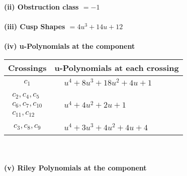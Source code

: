 \documentclass[1p]{elsarticle_modified}
\theoremstyle{definition}
\begin{document}
\flushleft \textbf{(ii) Obstruction class $= -1$}\\~\\
\flushleft \textbf{(iii) Cusp Shapes $= 4 u^3+14 u+12$}\\~\\
\newpage\renewcommand{\arraystretch}{1}
\flushleft \textbf{(iv) u-Polynomials at the component}\newline \\
\begin{tabular}{m{50pt}|m{274pt}}
Crossings & \hspace{64pt}u-Polynomials at each crossing \\
\hline $$\begin{aligned}c_{1}\end{aligned}$$&$\begin{aligned}
&u^4+8 u^3+18 u^2+4 u+1
\end{aligned}$\\
\hline $$\begin{aligned}c_{2},c_{4},c_{5}\\c_{6},c_{7},c_{10}\\c_{11},c_{12}\end{aligned}$$&$\begin{aligned}
&u^4+4 u^2+2 u+1
\end{aligned}$\\
\hline $$\begin{aligned}c_{3},c_{8},c_{9}\end{aligned}$$&$\begin{aligned}
&u^4+3 u^3+4 u^2+4 u+4
\end{aligned}$\\
\hline
\end{tabular}\\~\\
\newpage\renewcommand{\arraystretch}{1}
\flushleft \textbf{(v) Riley Polynomials at the component}\newline \\
\end{document}
